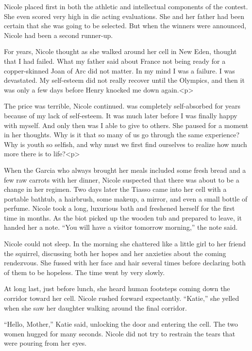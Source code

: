 \documentclass[]{article}
\begin{document}
{{Nicole placed first in both the athletic and intellectual components of the contest. She even scored very high in die acting evaluations. She and her father had been certain that she was going to be selected. But when the winners were announced, Nicole had been a second runner-up.

For years, Nicole thought as she walked around her cell in New Eden, thought that I had failed. What my father said about France not being ready for a copper-skinned Joan of Arc did not matter. In my mind I was a failure. I was devastated. My self-esteem did not really recover until the Olympics, and then it was only a few days before Henry knocked me down again.<p>

The price was terrible, Nicole continued. was completely self-absorbed for years because of my lack of self-esteem. It was much later before I was finally happy with myself. And only then was I able to give to others. She paused for a moment in her thoughts. Why is it that so many of us go through the same experience? Why is youth so selfish, and why must we first find ourselves to realize how much more there is to life?<p>

When the Garcia who always brought her meals included some fresh bread and a few raw carrots with her dinner, Nicole suspected that there was about to be a change in her regimen. Two days later the Tiasso came into her cell with a portable bathtub, a hairbrush, some makeup, a mirror, and even a small bottle of perfume. Nicole took a long, luxurious bath and freshened herself for the first time in months. As the biot picked up the wooden tub and prepared to leave, it handed her a note. “You will have a visitor tomorrow morning,” the note said.

Nicole could not sleep. In the morning she chattered like a little girl to her friend the squirrel, discussing both her hopes and her anxieties about the coming rendezvous. She fussed with her face and hair several times before declaring both of them to be hopeless. The time went by very slowly.

At long last, just before lunch, she heard human footsteps coming down the corridor toward her cell. Nicole rushed forward expectantly. “Katie,” she yelled when she saw her daughter walking around the final corridor.

“Hello, Mother,” Katie said, unlocking the door and entering the cell. The two women hugged for many seconds. Nicole did not try to restrain the tears that were pouring from her eyes.

}}
\end{document}
